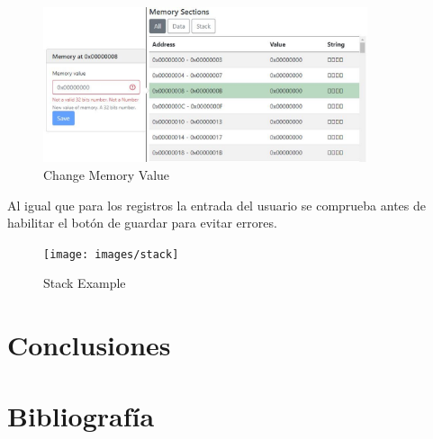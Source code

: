 {{            \begin{figure}[h]
                \centering
                \includegraphics[width=0.85\textwidth]{images/modifymemory}
                \caption{Change Memory Value}
            \end{figure}
            Al igual que para los registros la entrada del usuario se comprueba antes de habilitar el botón de guardar para evitar errores.


            \begin{figure}[h]
                \centering
                \texttt{[image: images/stack]}
                \caption{Stack Example}
            \end{figure}            
        }
    }

\section{Conclusiones}
{
}

\section{Bibliografía}
{
}

